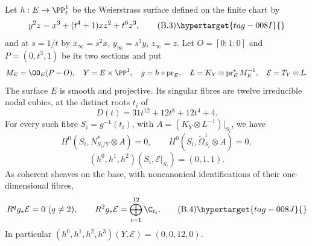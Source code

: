
\begin{proposition}\hypertarget{tag-01BL}{}\label{cdp:st:B2}


Let $h:E\to\PP^1_t$ be the Weierstrass surface defined on the finite chart by
\[
 y^2z=x^3+(t^4+1)xz^2+t^6z^3,                          \tag{B.3}\hypertarget{tag-008I}{}\label{cdp:eq:B.3}
\]
and at $s=1/t$ by $x_\infty=s^2x$, $y_\infty=s^3y$, $z_\infty=z$. Let $O=[0:1:0]$ and $P=(0,t^3,1)$ be its two sections and put
\[
 M_E=\OO_E(P-O),\quad Y=E\times\PP^1,\quad
 g=h\circ\operatorname{pr}_E,\quad
 L=K_Y\otimes\operatorname{pr}_E^*M_E^{-1},\quad
 \mathcal E=T_Y\otimes L.
\]
The surface $E$ is smooth and projective. Its singular fibres are twelve irreducible nodal cubics, at the distinct roots $t_i$ of
\[
 D(t)=31t^{12}+12t^8+12t^4+4.
\]
For every such fibre $S_i=g^{-1}(t_i)$, with $A=(K_Y\otimes L^{-1})|_{S_i}$, we have
\[
H^0(S_i,N^*_{S_i/Y}\otimes A)=0,
\qquad H^0(S_i,\widetilde\Omega^1_{S_i}\otimes A)=0,
\]
\[
 (h^0,h^1,h^2)(S_i,\mathcal E|_{S_i})=(0,1,1).
\]
As coherent sheaves on the base, with noncanonical identifications of their one-dimensional fibres,
\[
 R^qg_*\mathcal E=0\ (q\ne2),\qquad
 R^2g_*\mathcal E=\bigoplus_{i=1}^{12}\C_{t_i}.        \tag{B.4}\hypertarget{tag-008J}{}\label{cdp:eq:B.4}
\]
In particular $(h^0,h^1,h^2,h^3)(Y,\mathcal E)=(0,0,12,0)$.
\end{proposition}

